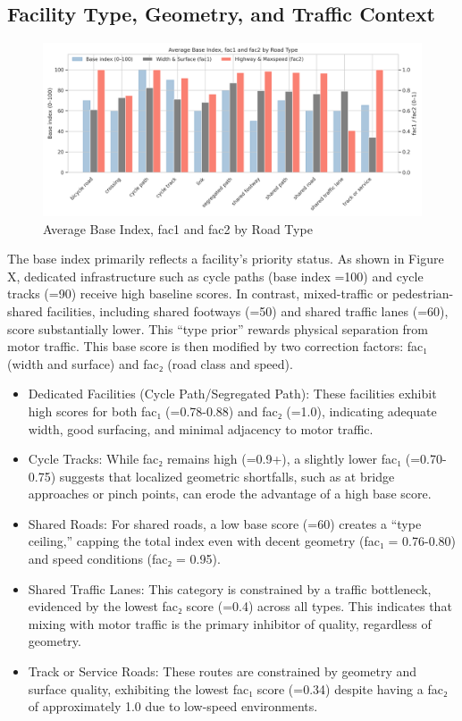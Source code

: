 \documentclass[
  12pt,
  oneside]{book}
\begin{document}
\subsection{Facility Type, Geometry, and Traffic Context}\label{facility-type-geometry-and-traffic-context}

\begin{figure}

{\centering \includegraphics[width=0.75\linewidth]{general_images/fac1_2} 

}

\caption{Average Base Index, fac1 and fac2 by Road Type}\label{fig:fac12}
\end{figure}

The base index primarily reflects a facility's priority status. As shown in Figure X, dedicated infrastructure such as cycle paths (base index =100) and cycle tracks (=90) receive high baseline scores. In contrast, mixed-traffic or pedestrian-shared facilities, including shared footways (=50) and shared traffic lanes (=60), score substantially lower. This ``type prior'' rewards physical separation from motor traffic. This base score is then modified by two correction factors: fac₁ (width and surface) and fac₂ (road class and speed).

\begin{itemize}
\item
  Dedicated Facilities (Cycle Path/Segregated Path): These facilities exhibit high scores for both fac₁ (=0.78-0.88) and fac₂ (=1.0), indicating adequate width, good surfacing, and minimal adjacency to motor traffic.
\item
  Cycle Tracks: While fac₂ remains high (=0.9+), a slightly lower fac₁ (=0.70-0.75) suggests that localized geometric shortfalls, such as at bridge approaches or pinch points, can erode the advantage of a high base score.
\item
  Shared Roads: For shared roads, a low base score (=60) creates a ``type ceiling,'' capping the total index even with decent geometry (fac₁ = 0.76-0.80) and speed conditions (fac₂ = 0.95).
\item
  Shared Traffic Lanes: This category is constrained by a traffic bottleneck, evidenced by the lowest fac₂ score (=0.4) across all types. This indicates that mixing with motor traffic is the primary inhibitor of quality, regardless of geometry.
\item
  Track or Service Roads: These routes are constrained by geometry and surface quality, exhibiting the lowest fac₁ score (=0.34) despite having a fac₂ of approximately 1.0 due to low-speed environments.
\end{itemize}
\end{document}
